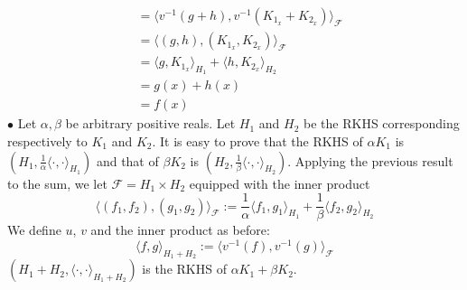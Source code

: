 \documentclass[a4paper,11pt, hidelinks]{article}
\begin{document}
\begin{enumerate}
$$\begin{aligned}
    &= \langle v^{-1}(g+h) , v^{-1}(K_{1_{x}} + K_{2_{x}}) \rangle_{\mathcal F}\\
    &= \langle (g,h) , (K_{1_{x}}, K_{2_{x}}) \rangle_{\mathcal F}\\
    &= \langle g, K_{1_{x}} \rangle_{H_1} + \langle h, K_{2_{x}} \rangle_{H_2}\\
    &= g(x) + h(x)\\
    &= f(x)
  \end{aligned}$$
  $\bullet$ Let $\alpha, \beta$ be arbitrary positive reals. Let $H_1$ and $H_2$ be the RKHS corresponding respectively to $K_1$ and $K_2$. It is easy to prove that the RKHS of $\alpha K_1$ is $(H_1, \frac 1 \alpha \langle \cdot, \cdot \rangle_{H_1})$ and that of $\beta K_2$ is $(H_2, \frac 1 \beta \langle \cdot, \cdot \rangle_{H_2})$. Applying the previous result to the sum, we let $\mathcal F = H_1\times H_2$ equipped with the inner product $$\langle (f_1,f_2), (g_1,g_2)\rangle_{\mathcal F} := \frac 1 \alpha\langle f_1, g_1 \rangle_{H_1} + \frac 1 \beta\langle f_2, g_2 \rangle_{H_2}$$ We define $u$, $v$ and the inner product as before: $$\langle f,g \rangle_{H_1+H_2}:= \langle v^{-1}(f), v^{-1}(g)\rangle_{\mathcal F}$$
  $(H_1+H_2, \langle \cdot,\cdot \rangle_{H_1+H_2})$ is the RKHS of $\alpha K_1 + \beta K_2$.


\end{enumerate}
\end{document}
